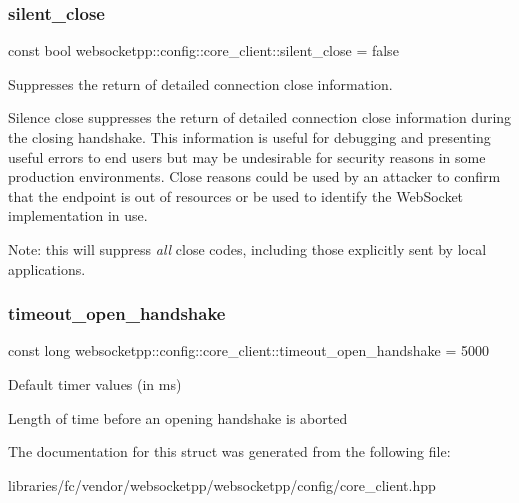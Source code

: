 \subsubsection{\texorpdfstring{silent\+\_\+close}{silent\_close}}
{\footnotesize\ttfamily const bool websocketpp\+::config\+::core\+\_\+client\+::silent\+\_\+close = false\hspace{0.3cm}{\ttfamily [static]}}



Suppresses the return of detailed connection close information. 

Silence close suppresses the return of detailed connection close information during the closing handshake. This information is useful for debugging and presenting useful errors to end users but may be undesirable for security reasons in some production environments. Close reasons could be used by an attacker to confirm that the endpoint is out of resources or be used to identify the Web\+Socket implementation in use.

Note\+: this will suppress {\itshape all} close codes, including those explicitly sent by local applications. \mbox{\label{structwebsocketpp_1_1config_1_1core__client_aad4057440517a8586c2dfebdbca0936c}} 
\subsubsection{\texorpdfstring{timeout\+\_\+open\+\_\+handshake}{timeout\_open\_handshake}}
{\footnotesize\ttfamily const long websocketpp\+::config\+::core\+\_\+client\+::timeout\+\_\+open\+\_\+handshake = 5000\hspace{0.3cm}{\ttfamily [static]}}



Default timer values (in ms) 

Length of time before an opening handshake is aborted 

The documentation for this struct was generated from the following file\+:\begin{DoxyCompactItemize}
\item 
libraries/fc/vendor/websocketpp/websocketpp/config/core\+\_\+client.\+hpp\end{DoxyCompactItemize}
